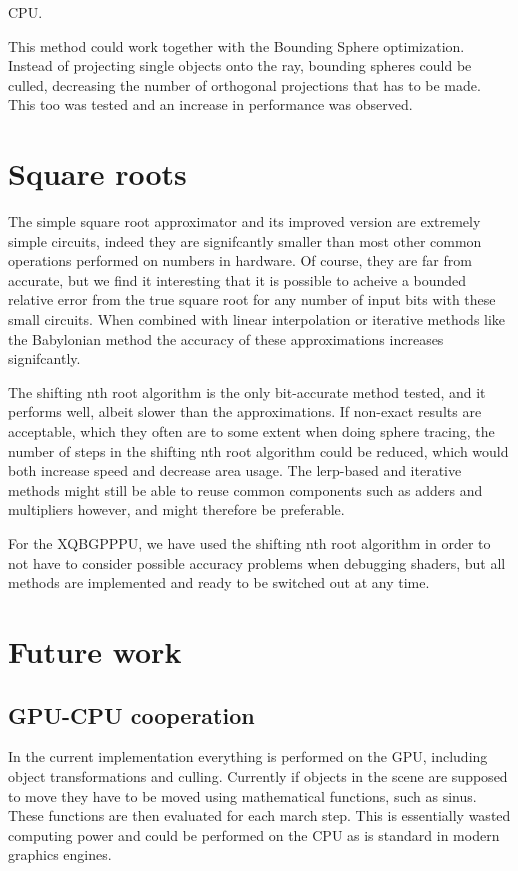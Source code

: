 			CPU.

			This method could work together with the Bounding Sphere 
			optimization. Instead of projecting single objects onto the ray,
			bounding spheres could be culled, decreasing the number of 
			orthogonal projections that has to be made. This too was tested 
			and an increase in performance was observed.

	\section{Square roots}

		The simple square root approximator and its improved version are
		extremely simple circuits, indeed they are signifcantly smaller than
		most other common operations performed on numbers in hardware. Of
		course, they are far from accurate, but we find it interesting that it
		is possible to acheive a bounded relative error from the true square
		root for any number of input bits with these small circuits. When
		combined with linear interpolation or iterative methods like the
		Babylonian method the accuracy of these approximations increases 
		signifcantly.
		
		The shifting nth root algorithm is the only bit-accurate method tested,
		and it performs well, albeit slower than the approximations. If
		non-exact results are acceptable, which they often are to some extent
		when doing sphere tracing, the number of steps in the shifting nth root
		algorithm could be reduced, which would both increase speed and
		decrease area usage. The lerp-based and iterative methods might still
		be able to reuse common components such as adders and multipliers 
		however, and might therefore be preferable.
		
		For the XQBGPPPU, we have used the shifting nth root algorithm in order
		to not have to consider possible accuracy problems when debugging 
		shaders, but all methods are implemented and ready to be switched out
		at any time.

	\section{Future work}

		\subsection{GPU-CPU cooperation}

            In the current implementation everything is performed on the GPU,
            including object transformations and culling. Currently if objects 
            in the scene are supposed to move they have to be moved using 
            mathematical functions, such as sinus. These functions are then evaluated for each march step. This is essentially wasted computing power and could be performed on the CPU as is standard in modern graphics engines.



